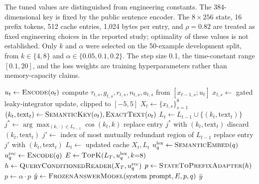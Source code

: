 \documentclass[conference]{IEEEtran}
\begin{document}
The tuned values are distinguished from engineering constants. The 384-dimensional key is fixed by the public sentence encoder. The $8\times256$ state, 16 prefix tokens, 512 cache entries, 1,024 bytes per entry, and $\rho=0.82$ are treated as fixed engineering choices in the reported study; optimality of these values is not established. Only $k$ and $\alpha$ were selected on the 50-example development split, from $k\in\{4,8\}$ and $\alpha\in\{0.05,0.1,0.2\}$. The step size 0.1, the time-constant range $[0.1,20]$, and the loss weights are training hyperparameters rather than memory-capacity claims.

\begin{algorithm}[!t]
\footnotesize
\caption{LALM query-independent write and query-time read}
\label{alg:lalm}
\begin{algorithmic}[1]
  \State $u_t \gets \Call{Encode}{o_t}$ 
    \State compute $\tau_{t,s}, g_{t,s}, r_{t,s}, n_{t,s}, a_{t,s}$ from $[x_{t-1,s}; u_t]$ 
    \State $x_{t,s} \gets$ gated leaky-integrator update, clipped to $[-5,5]$ 
  \EndFor
  \State $X_t \gets \{x_{t,s}\}_{s=1}^{8}$
  \State $(k_t, \text{text}_t) \gets \Call{SemanticKey}{o_t}, \Call{ExactText}{o_t}$
    \State $L_t \gets L_{t-1} \cup \{(k_t, \text{text}_t)\}$
  \Else
    \State $j^\ast \gets \arg\max_{(k,\cdot) \in L_{t-1}} \cos(k_t, k)$
        \State replace entry $j^\ast$ with $(k_t, \text{text}_t)$ 
      \Else
        \State discard $(k_t, \text{text}_t)$ 
      \EndIf
    \Else
      \State $j' \gets$ index of most mutually redundant region of $L_{t-1}$
      \State replace entry $j'$ with $(k_t, \text{text}_t)$ 
    \EndIf
    \State $L_t \gets$ updated cache
  \EndIf
  \State \Return $X_t, L_t$
\EndProcedure
\Statex
{}
  \State $u_q^{\text{lex}} \gets \Call{SemanticEmbed}{q}$ 
  \State $u_q^{\text{rec}} \gets \Call{Encode}{q}$ 
  \State $E \gets \Call{TopK}{L_T, u_q^{\text{lex}}, k{=}8}$ 
  \State $h \gets \Call{QueryConditionedReader}{X_T, u_q^{\text{rec}}}$
  \State $p \gets \Call{StateToPrefixAdapter}{h}$ 
    \State $p \gets \alpha \cdot p$ 
  \EndIf
  \State $\hat{y} \gets \Call{FrozenAnswerModel}{\text{system prompt}, E, p, q}$
  \State \Return $\hat{y}$
\EndProcedure
\end{algorithmic}
\end{algorithm}
\end{document}
